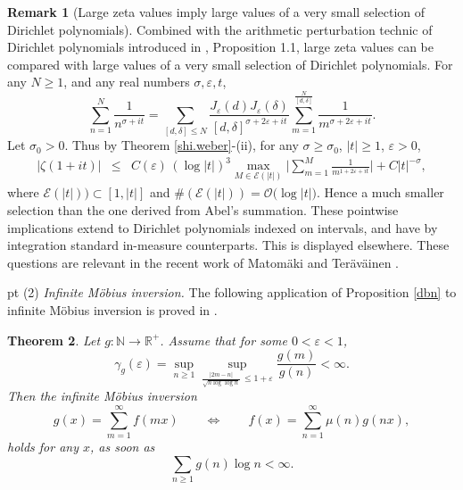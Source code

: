 \documentclass[11pt,draft,reqno]{amsart}
\newtheorem{theorem}{Theorem}[section]
\theoremstyle{definition}
\theoremstyle{remarks}
\newtheorem{remark}[theorem]{{\bf  Remark}}
\numberwithin{equation}{section}
\def \d{{\delta}}
\def \e{{\varepsilon}}
\def \g{{\gamma}}
\def \m{{\mu}}
\def \s{{\sigma}}
\def \noi{{\noindent}}
\def \qq{{\qquad}}
\def\R{{\mathbb R}}
\def\N{{\mathbb N}}
\begin{document}
\begin{remark}[Large zeta values imply large values of a very small selection of Dirichlet polynomials]\rm Combined with the arithmetic perturbation technic of Dirichlet polynomials     introduced in \cite{Sh.We},  Proposition 1.1, 
  large zeta values can be  compared with large values of a very small selection of Dirichlet polynomials. For any $N\ge1$,  and any  real numbers $\s,\e, t$,
  \begin{equation}\label{e2}\sum_{n=1}^N \frac{1}{n^{\s +it}}  =\sum_{[d,\d]\le N}   \frac{J_\e (d)J_\e (\d)}{[d,\d]^{{\s +2\e+it}}}
\sum_{m=1}^{ \frac{N}{[d,\d]}}            \frac{1} {m^{{\s+2\e +it}}}.
\end{equation}
    Let $\s_0>0$. %
    Thus by Theorem \ref{shi.weber}-(ii), for any   $\s\ge \s_0$,  $|t|\ge 1$, $\e> 0$,\begin{eqnarray*}\big|\zeta(1 + it) \big|&\le& C(\e)\, (\log |t|)^3  \max_{M\in\mathcal E({|t|})} \Big|\sum_{m=1}^{M} \frac{1}{m^{{1+2\e +it}}}\Big|+ C  |t|^{-\s},
\end{eqnarray*}
where $\mathcal E(|t|))\subset [1, |t|]$ and 
$\#(\mathcal E(|t|))=\mathcal O\big( \log |t|\big)$. Hence a much smaller selection than the one derived from Abel's summation. These pointwise implications extend to Dirichlet polynomials indexed on intervals, and have by integration standard in-measure counterparts. This is displayed elsewhere. These questions are relevant in the recent work of     Matom\"aki and  Ter\"av\"ainen \cite{MT}.
\end{remark}
 pt
\noi(2) {\it Infinite M\"obius inversion.}  The following application of Proposition \ref{dbn} to infinite M\"obius inversion is proved in \cite{W11}.
\begin{theorem}\label{t2} Let $g:\N\to \R^+$. Assume that  for some $0<\e<1$,
\begin{equation}\label{locvar[g]}    \g_g(\e)= \sup_{n\ge 1} \sup_{\frac{|2m-n |}{\sqrt{n\log\log n}}\,\le 1+\e}\frac{ g(m) }{ g(n) }<\infty.
\end{equation}
Then the infinite M\"obius inversion 
\begin{equation}\label{HW} 
g(x) =\sum_{m=1}^\infty f(mx)\qq \Leftrightarrow \qq f(x) =\sum_{n=1}^\infty \m(n)g(nx),
\end{equation} holds for any $x$, as soon as
\begin{equation}\label{imi[g]} \sum_{n\ge 1} g(n)  \log n<\infty.\end{equation} 
\end{theorem}
\end{document}
